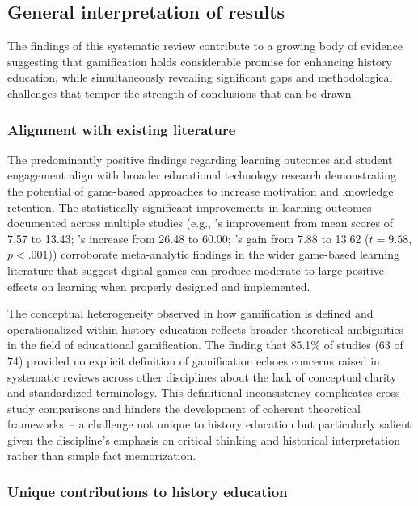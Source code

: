 \documentclass[a4paper,fleqn]{cas-sc}
\begin{document}
\subsection{General interpretation of results}

The findings of this systematic review contribute to a growing body of evidence suggesting that gamification holds considerable promise for enhancing history education, while simultaneously revealing significant gaps and methodological challenges that temper the strength of conclusions that can be drawn.

\subsubsection{Alignment with existing literature}

The predominantly positive findings regarding learning outcomes and student engagement align with broader educational technology research demonstrating the potential of game-based approaches to increase motivation and knowledge retention. The statistically significant improvements in learning outcomes documented across multiple studies (e.g., \citeauthor{1Barbatsis201159}'s \citeyearpar{1Barbatsis201159} improvement from mean scores of 7.57 to 13.43; \citeauthor{9Lin2018}'s  \citeyearpar{9Lin2018} increase from 26.48 to 60.00; \citeauthor{19Chou2019}'s \citeyearpar{19Chou2019} gain from 7.88 to 13.62 ($t=9.58$, $p<.001$)) corroborate meta-analytic findings in the wider game-based learning literature that suggest digital games can produce moderate to large positive effects on learning when properly designed and implemented.

The conceptual heterogeneity observed in how gamification is defined and operationalized within history education reflects broader theoretical ambiguities in the field of educational gamification. The finding that 85.1\% of studies (63 of 74) provided no explicit definition of gamification echoes concerns raised in systematic reviews across other disciplines about the lack of conceptual clarity and standardized terminology. This definitional inconsistency complicates cross-study comparisons and hinders the development of coherent theoretical frameworks~-- a challenge not unique to history education but particularly salient given the discipline's emphasis on critical thinking and historical interpretation rather than simple fact memorization.

\subsubsection{Unique contributions to history education}
\end{document}
